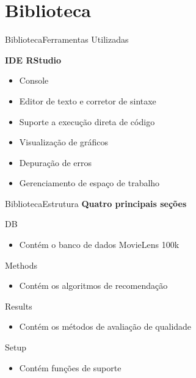 \section[Biblioteca]{Biblioteca}
\begin{frame}{Biblioteca}{Ferramentas Utilizadas}

\textbf{IDE RStudio}
	\begin{itemize}
		\item Console
		\item Editor de texto e corretor de sintaxe
		\item Suporte a execução direta de código
		\item Visualização de gráficos
		\item Depuração de erros
		\item Gerenciamento de espaço de trabalho
	\end{itemize}
\end{frame}

\begin{frame}{Biblioteca}{Estrutura}
\textbf{Quatro principais seções}
\begin{description}
	\item DB
	\begin{itemize}
		\item Contém o banco de dados MovieLens 100k
	\end{itemize}
	\item Methods
	\begin{itemize}
		\item Contém os algoritmos de recomendação
	\end{itemize}
	\item Results
	\begin{itemize}
		\item Contém os métodos de avaliação de qualidade
	\end{itemize}
	\item Setup
	\begin{itemize}
		\item Contém funções de suporte
	\end{itemize}
\end{description}
\end{frame}
